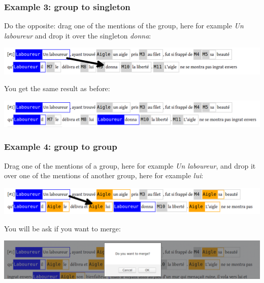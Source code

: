 \documentclass[12pt]{article}
\begin{document}
 \subsubsection{Example 3: group to singleton}

Do the opposite: drag one of the mentions of the group, here for example
\emph{Un laboureur} and drop it over the singleton \emph{donna}:\nopagebreak

\includegraphics[width=17cm]{imgs/dd_example_02_before.png}

You get the same result as before:\nopagebreak

\includegraphics[width=17cm]{imgs/dd_example_02_after.png}

 \subsubsection{Example 4: group to group}

\label{sec:merging-example}

Drag one of the mentions of a group, here for example \emph{Un laboureur},
and drop it over one of the mentions of another group, here for example 
\emph{lui}:\nopagebreak

\includegraphics[width=17cm]{imgs/dd_example_03_before.png}

You will be ask if you want to merge:\nopagebreak

\includegraphics[width=17cm]{imgs/dd_example_03_dialog.png}
\end{document}
